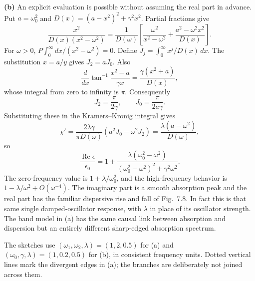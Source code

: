 \textbf{(b)} An explicit evaluation is possible without assuming the
real part in advance. Put $a=\omega_0^2$ and
$D(x)=(a-x^2)^2+\gamma^2x^2$. Partial fractions give
\[
\frac{x^2}{D(x)(x^2-\omega^2)}
=\frac1{D(\omega)}\left[
\frac{\omega^2}{x^2-\omega^2}
+\frac{a^2-\omega^2x^2}{D(x)}\right].
\]
For $\omega>0$, $P\int_0^\infty dx/(x^2-\omega^2)=0$.
Define $J_j=\int_0^\infty x^j/D(x)\,dx$. The substitution
$x=a/y$ gives $J_2=aJ_0$. Also
\[
\frac d{dx}\tan^{-1}\!\frac{x^2-a}{\gamma x}
=\frac{\gamma(x^2+a)}{D(x)},
\]
whose integral from zero to infinity is $\pi$. Consequently
\[
J_2=\frac\pi{2\gamma},\qquad J_0=\frac\pi{2a\gamma}.
\]
Substituting these in the Kramers--Kronig integral gives
\[
\chi'=\frac{2\lambda\gamma}{\pi D(\omega)}
(a^2J_0-\omega^2J_2)
=\frac{\lambda(a-\omega^2)}{D(\omega)},
\]
so
\[
\boxed{\frac{\operatorname{Re}\epsilon}{\epsilon_0}
=1+\frac{\lambda(\omega_0^2-\omega^2)}
{(\omega_0^2-\omega^2)^2+\gamma^2\omega^2}.}
\]
The zero-frequency value is $1+\lambda/\omega_0^2$, and the
high-frequency behavior is $1-\lambda/\omega^2+O(\omega^{-4})$.
The imaginary part is a smooth absorption peak and the real part
has the familiar dispersive rise and fall of Fig.~7.8. In fact this
is that same single damped-oscillator response, with $\lambda$ in
place of its oscillator strength. The band model in (a) has the
same causal link between absorption and dispersion but an entirely
different sharp-edged absorption spectrum.

The sketches use $(\omega_1,\omega_2,\lambda)=(1,2,0.5)$ for (a)
and $(\omega_0,\gamma,\lambda)=(1,0.2,0.5)$ for (b), in consistent
frequency units. Dotted vertical lines mark the divergent edges
in (a); the branches are deliberately not joined across them.
\begin{center}

\end{center}

